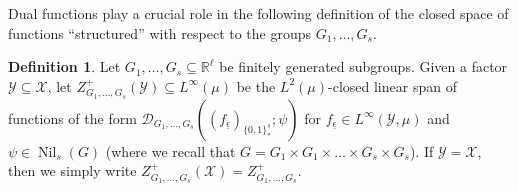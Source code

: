 \documentclass[11pt]{amsart}
\theoremstyle{definition}
\newtheorem{definition}[lemma]{Definition}
\newcommand{\C}{{\mathbb C}}
\newcommand{\R}{{\mathbb R}}
\newcommand{\CD}{{\mathcal D}}
\newcommand{\CX}{{\mathcal X}}
\newcommand{\CY}{{\mathcal Y}}
\newcommand{\ueps}{{\underline{\epsilon}}}
\newcommand{\1}{{\mathbf{1}}}
\DeclareMathOperator{\Nil}{Nil}
\begin{document}

Dual functions play a crucial role in the following definition of the closed space of functions ``structured'' with respect to the groups $G_1, \ldots, G_s$.
\begin{definition}\label{D: factor}
    Let $G_1, \ldots, G_s\subseteq\R^\ell$ be finitely generated subgroups.
    Given a factor $\CY\subseteq \CX$, let $Z_{G_1, \ldots, G_s}^+(\CY)\subseteq L^\infty(\mu)$ be the $L^2(\mu)$-closed linear span of functions of the form 
$\CD_{G_1, \ldots, G_s}((f_\ueps)_{\{0,1\}^s_*}; \psi)$ for $f_\ueps\in L^\infty(\CY, \mu)$ and $\psi\in\Nil_s(G)$
(where we recall that $G = G_1\times G_1\times\ldots \times G_s\times G_s$). If $\CY = \CX$, then we simply write $Z_{G_1, \ldots, G_s}^+(\CX) = Z_{G_1, \ldots, G_s}^+$.



\end{definition}
\end{document}
